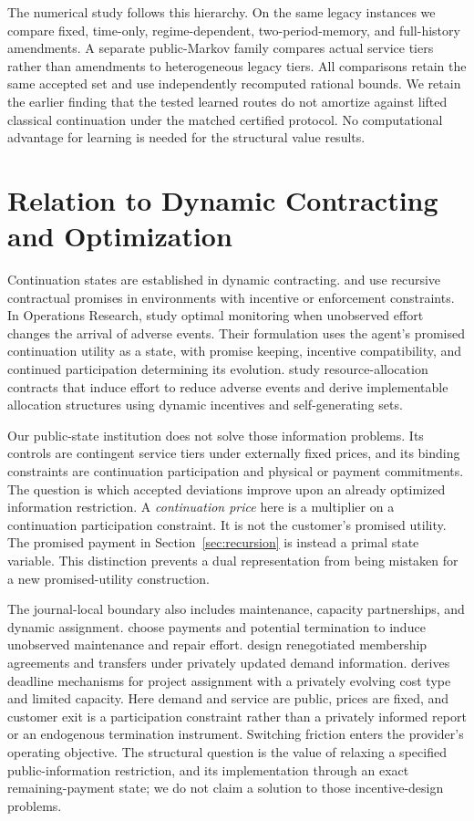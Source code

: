 \documentclass[11pt,letterpaper]{article}
\theoremstyle{definition}\newtheorem{assumption}[theorem]{Assumption}
\begin{document}
The numerical study follows this hierarchy. On the same legacy instances we compare fixed, time-only, regime-dependent, two-period-memory, and full-history amendments. A separate public-Markov family compares actual service tiers rather than amendments to heterogeneous legacy tiers. All comparisons retain the same accepted set and use independently recomputed rational bounds. We retain the earlier finding that the tested learned routes do not amortize against lifted classical continuation under the matched certified protocol. No computational advantage for learning is needed for the structural value results.

\section{Relation to Dynamic Contracting and Optimization}\label{sec:literature}
Continuation states are established in dynamic contracting. \citet{SpearSrivastava1987} and \citet{ThomasWorrall1988} use recursive contractual promises in environments with incentive or enforcement constraints. In Operations Research, \citet{ChenSunXiao2020} study optimal monitoring when unobserved effort changes the arrival of adverse events. Their formulation uses the agent's promised continuation utility as a state, with promise keeping, incentive compatibility, and continued participation determining its evolution. \citet{LiangSunTangZhang2023} study resource-allocation contracts that induce effort to reduce adverse events and derive implementable allocation structures using dynamic incentives and self-generating sets.

Our public-state institution does not solve those information problems. Its controls are contingent service tiers under externally fixed prices, and its binding constraints are continuation participation and physical or payment commitments. The question is which accepted deviations improve upon an already optimized information restriction. A \emph{continuation price} here is a multiplier on a continuation participation constraint. It is not the customer's promised utility. The promised payment in Section~\ref{sec:recursion} is instead a primal state variable. This distinction prevents a dual representation from being mistaken for a new promised-utility construction.

The journal-local boundary also includes maintenance, capacity partnerships, and dynamic assignment. \citet{TianSunDuenyas2021} choose payments and potential termination to induce unobserved maintenance and repair effort. \citet{LiuLewisSongKuribko2019} design renegotiated membership agreements and transfers under privately updated demand information. \citet{He2023} derives deadline mechanisms for project assignment with a privately evolving cost type and limited capacity. Here demand and service are public, prices are fixed, and customer exit is a participation constraint rather than a privately informed report or an endogenous termination instrument. Switching friction enters the provider's operating objective. The structural question is the value of relaxing a specified public-information restriction, and its implementation through an exact remaining-payment state; we do not claim a solution to those incentive-design problems.
\end{document}
